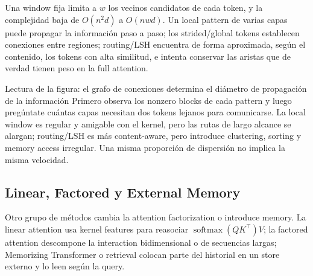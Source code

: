 Una window fija limita a $w$ los vecinos candidatos de cada token, y la complejidad baja de $O(n^2d)$ a $O(nwd)$. Un local pattern de varias capas puede propagar la información paso a paso; los strided/global tokens establecen conexiones entre regiones; routing/LSH encuentra de forma aproximada, según el contenido, los tokens con alta similitud, e intenta conservar las aristas que de verdad tienen peso en la full attention.


\begin{knowledgebox}{Lectura de la figura: el grafo de conexiones determina el diámetro de propagación de la información}
Primero observa los nonzero blocks de cada pattern y luego pregúntate cuántas capas necesitan dos tokens lejanos para comunicarse. La local window es regular y amigable con el kernel, pero las rutas de largo alcance se alargan; routing/LSH es más content-aware, pero introduce clustering, sorting y memory access irregular. Una misma proporción de dispersión no implica la misma velocidad.
\end{knowledgebox}


\subsection{Linear, Factored y External Memory}

Otro grupo de métodos cambia la attention factorization o introduce memory. La linear attention usa kernel features para reasociar $\operatorname{softmax}(QK^\top)V$; la factored attention descompone la interaction bidimensional o de secuencias largas; Memorizing Transformer o retrieval colocan parte del historial en un store externo y lo leen según la query.


